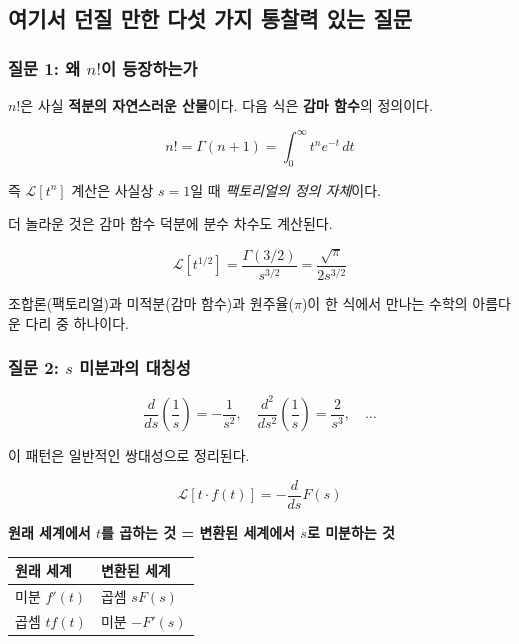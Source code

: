 \documentclass[11pt,a4paper]{article}
\begin{document}
\subsection{여기서 던질 만한 다섯 가지 통찰력 있는 질문}

\subsubsection{질문 1: 왜 $n!$이 등장하는가}

$n!$은 사실 \textbf{적분의 자연스러운 산물}이다. 다음 식은 \textbf{감마 함수}의 정의이다.

\begin{equation}
n! = \Gamma(n+1) = \int_0^\infty t^n e^{-t}\, dt
\end{equation}

즉 $\mathcal{L}[t^n]$ 계산은 사실상 $s=1$일 때 \emph{팩토리얼의 정의 자체}이다.

더 놀라운 것은 감마 함수 덕분에 분수 차수도 계산된다.

\begin{equation}
\mathcal{L}[t^{1/2}] = \frac{\Gamma(3/2)}{s^{3/2}} = \frac{\sqrt{\pi}}{2s^{3/2}}
\end{equation}

조합론(팩토리얼)과 미적분(감마 함수)과 원주율($\pi$)이 한 식에서 만나는 수학의 아름다운 다리 중 하나이다.

\subsubsection{질문 2: $s$ 미분과의 대칭성}

\begin{equation}
\frac{d}{ds}\left(\frac{1}{s}\right) = -\frac{1}{s^2}, \quad \frac{d^2}{ds^2}\left(\frac{1}{s}\right) = \frac{2}{s^3}, \quad \ldots
\end{equation}

이 패턴은 일반적인 쌍대성으로 정리된다.

\begin{equation}
\mathcal{L}[t \cdot f(t)] = -\frac{d}{ds}F(s)
\end{equation}

\textbf{원래 세계에서 $t$를 곱하는 것 = 변환된 세계에서 $s$로 미분하는 것}

\begin{center}
\begin{tabular}{ll}
\toprule
원래 세계 & 변환된 세계 \\
\midrule
미분 $f'(t)$ & 곱셈 $sF(s)$ \\
곱셈 $tf(t)$ & 미분 $-F'(s)$ \\
\bottomrule
\end{tabular}
\end{center}
\end{document}
